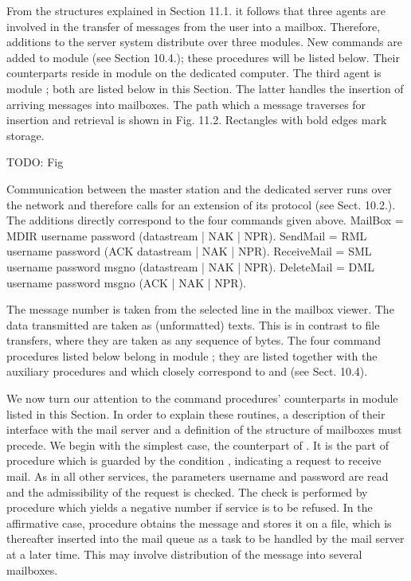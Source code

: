 From the structures explained in Section 11.1. it follows that three agents are involved in the transfer of messages from the user into a mailbox. Therefore, additions to the server system distribute over three modules. New commands are added to module  (see Section 10.4.); these procedures will be listed below. Their counterparts reside in module  on the dedicated computer. The third agent is module ; both are listed below in this Section. The latter handles the insertion of arriving messages into mailboxes. The path which a message traverses for insertion and retrieval is shown in Fig. 11.2. Rectangles with bold edges mark storage.

TODO: Fig

Communication between the master station and the dedicated server runs over the network and therefore calls for an extension of its protocol (see Sect. 10.2.). The additions directly correspond to the four commands given above.
\begintt
MailBox = MDIR username password (datastream | NAK | NPR).
SendMail = RML username password (ACK datastream | NAK | NPR).
ReceiveMail = SML username password msgno (datastream | NAK | NPR).
DeleteMail = DML username password msgno (ACK | NAK | NPR).
\endtt

\noindent  The message number is taken from the selected line in the mailbox viewer. The data transmitted are taken as (unformatted) texts. This is in contrast to file transfers, where they are taken as any sequence of bytes. The four command procedures listed below belong in module ; they are listed together with the auxiliary procedures  and  which closely correspond to  and  (see Sect. 10.4).

We now turn our attention to the command procedures' counterparts in module  listed in this Section. In order to explain these routines, a description of their interface with the mail server and a definition of the structure of mailboxes must precede. We begin with the simplest case, the counterpart of . It is the part of procedure  which is guarded by the condition , indicating a request to receive mail. As in all other services, the parameters username and password are read and the admissibility of the request is checked. The check is performed by procedure  which yields a negative number if service is to be refused. In the affirmative case, procedure  obtains the message and stores it on a file, which is thereafter inserted into the mail queue as a task to be handled by the mail server at a later time. This may involve distribution of the message into several mailboxes.

